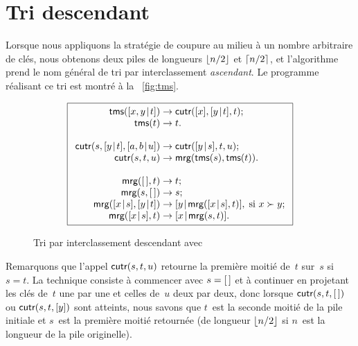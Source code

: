 \section{Tri descendant}

Lorsque nous appliquons la stratégie de coupure au milieu à un nombre
arbitraire de clés, nous obtenons deux piles de longueurs
\(\lfloor{n/2}\rfloor\) et \(\lceil{n/2}\rceil\), et l'algorithme prend le nom
général de tri par interclassement \emph{ascendant}. Le programme
réalisant ce tri est montré à la \fig~\vref{fig:tms}.
\begin{figure}[!b]
\begin{equation*}
\boxed{%
\begin{array}{r@{\;}l@{\;}l}
\fun{tms}(\cons{x,y}{t}) & \rightarrow
                         & \fun{cutr}([x],\cons{y}{t},t);\\
\fun{tms}(t)             & \rightarrow & t.\\
\\
\fun{cutr}(s,\cons{y}{t},\cons{a,b}{u})
                       & \rightarrow & \fun{cutr}(\cons{y}{s},t,u);\\
\fun{cutr}(s,t,u)        & \rightarrow
                         & \fun{mrg}(\fun{tms}(s),\fun{tms}(t)).\\
\\
\fun{mrg}(\el,t)         & \rightarrow & t;\\
\fun{mrg}(s,\el)         & \rightarrow & s;\\
\fun{mrg}(\cons{x}{s},\cons{y}{t}) & \rightarrow
                         & \cons{y}{\fun{mrg}(\cons{x}{s},t)},\;
                           \text{si \(x \succ y\)};\\
\fun{mrg}(\cons{x}{s},t) & \rightarrow & \cons{x}{\fun{mrg}(s,t)}.
\end{array}}
\end{equation*}
\caption{Tri par interclassement descendant avec }
\label{fig:tms}
\end{figure}

Remarquons que l'appel \(\textsf{cutr}(s,t,u)\)
retourne la première moitié de~\(t\) sur~\(s\) si~\(s=t\). La
technique consiste à commencer avec \(s=[\,]\) et à continuer en
projetant les clés de~\(t\) une par une et celles de~\(u\) deux par
deux, donc lorsque \(\textsf{cutr}(s,t,[\,])\) ou \(\textsf{cutr}(s,t,[y])\)
sont atteints, nous savons que \(t\)~est la seconde moitié de la pile
initiale et \(s\)~est la première moitié retournée (de longueur
\(\lfloor{n/2}\rfloor\) si \(n\)~est la longueur de la pile originelle).

